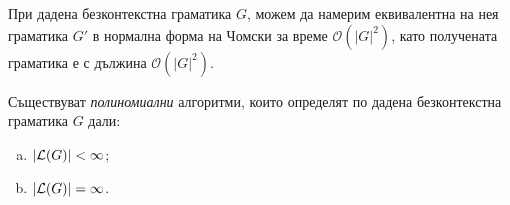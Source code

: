 \begin{theorem}
  При дадена безконтекстна граматика $G$, можем да намерим еквивалентна
  на нея граматика $G'$ в нормална форма на Чомски за време $\mathcal{O}(|G|^2)$,
  като получената граматика е с дължина $\mathcal{O}(|G|^2)$.
\end{theorem}

\begin{theorem}
  Съществуват \emph{полиномиални} алгоритми, които определят по дадена безконтекстна граматика $G$ дали:
  \begin{enumerate}[a)]
  \item
    $\vert{\mathcal{L}(G)}\vert < \infty$;
  \item
    $\vert{\mathcal{L}(G)}\vert = \infty$.
  \end{enumerate}
\end{theorem}
